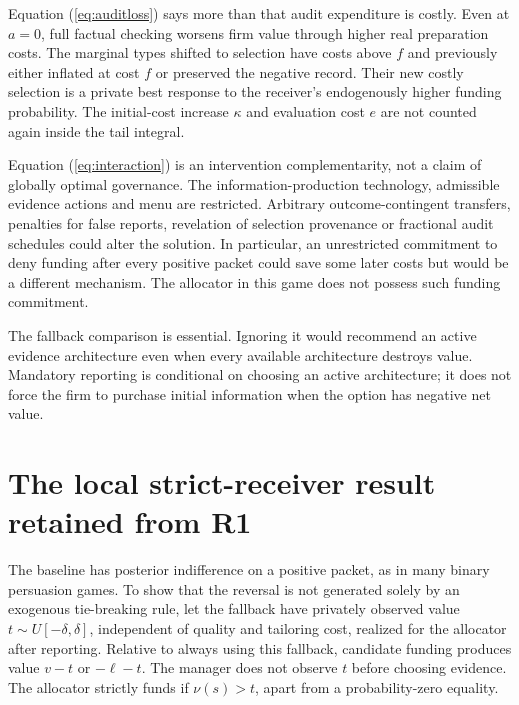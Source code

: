 \documentclass[11pt]{article}
\begin{document}
Equation (\ref{eq:auditloss}) says more than that audit expenditure is costly. Even at $a=0$, full factual checking worsens firm value through higher real preparation costs. The marginal types shifted to selection have costs above $f$ and previously either inflated at cost $f$ or preserved the negative record. Their new costly selection is a private best response to the receiver's endogenously higher funding probability. The initial-cost increase $\kappa$ and evaluation cost $e$ are not counted again inside the tail integral.

Equation (\ref{eq:interaction}) is an intervention complementarity, not a claim of globally optimal governance. The information-production technology, admissible evidence actions and menu are restricted. Arbitrary outcome-contingent transfers, penalties for false reports, revelation of selection provenance or fractional audit schedules could alter the solution. In particular, an unrestricted commitment to deny funding after every positive packet could save some later costs but would be a different mechanism. The allocator in this game does not possess such funding commitment.

The fallback comparison is essential. Ignoring it would recommend an active evidence architecture even when every available architecture destroys value. Mandatory reporting is conditional on choosing an active architecture; it does not force the firm to purchase initial information when the option has negative net value.

\section{The local strict-receiver result retained from R1}\label{sec:strict}
The baseline has posterior indifference on a positive packet, as in many binary persuasion games. To show that the reversal is not generated solely by an exogenous tie-breaking rule, let the fallback have privately observed value $t\sim U[-\delta,\delta]$, independent of quality and tailoring cost, realized for the allocator after reporting. Relative to always using this fallback, candidate funding produces value $v-t$ or $-\ell-t$. The manager does not observe $t$ before choosing evidence. The allocator strictly funds if $\nu(s)>t$, apart from a probability-zero equality.
\end{document}
